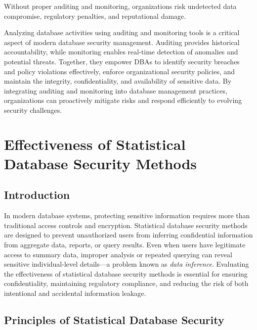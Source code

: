 \documentclass[12pt,a4paper]{article}
\begin{document}
Without proper auditing and monitoring, organizations risk undetected data compromise, regulatory penalties, and reputational damage.

\begin{conclusion}
Analyzing database activities using auditing and monitoring tools is a critical aspect of modern database security management. Auditing provides historical accountability, while monitoring enables real-time detection of anomalies and potential threats. Together, they empower DBAs to identify security breaches and policy violations effectively, enforce organizational security policies, and maintain the integrity, confidentiality, and availability of sensitive data. By integrating auditing and monitoring into database management practices, organizations can proactively mitigate risks and respond efficiently to evolving security challenges.
\end{conclusion}


\section{Effectiveness of Statistical Database Security Methods}

\subsection*{Introduction}

In modern database systems, protecting sensitive information requires more than traditional access controls and encryption. Statistical database security methods are designed to prevent unauthorized users from inferring confidential information from aggregate data, reports, or query results. Even when users have legitimate access to summary data, improper analysis or repeated querying can reveal sensitive individual-level details---a problem known as \textit{data inference}. Evaluating the effectiveness of statistical database security methods is essential for ensuring confidentiality, maintaining regulatory compliance, and reducing the risk of both intentional and accidental information leakage.

\subsection{Principles of Statistical Database Security}
\end{document}
